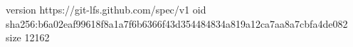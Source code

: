 version https://git-lfs.github.com/spec/v1
oid sha256:b6a02eaf99618f8a1a7f6b6366f43d354484834a819a12ca7aa8a7cbfa4de082
size 12162

